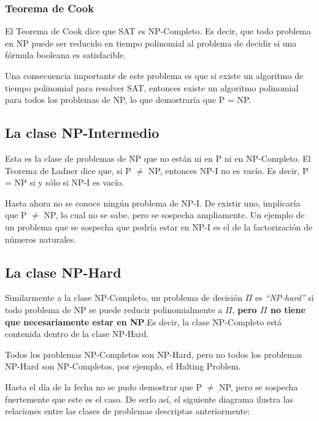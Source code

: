 \subsubsection{Teorema de Cook}

El Teorema de Cook dice que SAT es NP-Completo. Es decir, que todo problema en NP puede ser reducido en tiempo polinomial al problema de decidir si una f\'ormula booleana es satisfacible.

Una consecuencia importante de este problema es que si existe un algoritmo de tiempo polinomial para resolver SAT, entonces existe un algoritmo polinomial para todos los problemas de NP, lo que demostrar\'ia que P = NP.


\subsection{La clase NP-Intermedio}

Esta es la clase de problemas de NP que no est\'an ni en P ni en NP-Completo. El Teorema de Ladner dice que, si P $\neq$ NP, entonces NP-I no es vac\'io. Es decir, P = NP si y s\'olo si NP-I es vac\'io.

Hasta ahora no se conoce ning\'un problema de NP-I. De existir uno, implicar\'ia que P $\neq$ NP, lo cual no se sabe, pero se sospecha ampliamente. Un ejemplo de un problema que se sospecha que podr\'ia estar en NP-I es el de la factorizaci\'on de n\'umeros naturales.

\newpage
\subsection{La clase NP-Hard}

Similarmente a la clase NP-Completo, un problema de decisi\'on $\Pi$ es \emph{``NP-hard''} si todo problema de NP se puede reducir polinomialmente a $\Pi$, \textbf{pero $\Pi$ no tiene que necesariamente estar en NP}.Es decir, la clase NP-Completo est\'a contenida dentro de la clase NP-Hard. 

Todos los problemas NP-Completos son NP-Hard, pero no todos los problemas NP-Hard son NP-Completos, por ejemplo, el Halting Problem.

Hasta el d\'ia de la fecha no se pudo demostrar que P $\neq$ NP, pero se sospecha fuertemente que este es el caso. De serlo as\'i, el siguiente diagrama ilustra las relaciones entre las clases de problemas descriptas anteriormente:

\begin{figure}[htb]
    \centering
    
\end{figure}


